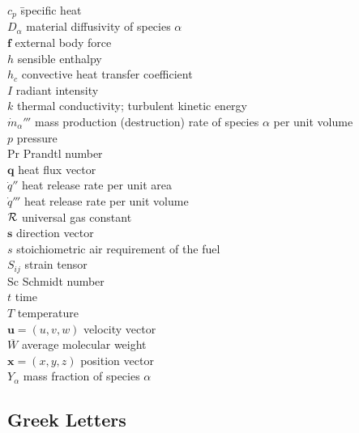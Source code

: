\documentclass[graybox]{svmult}
\begin{document}
\begin{tabbing}
$c_p$ 	\hspace{1in}     \= specific heat \\
$D_\alpha$	             \> material diffusivity of species $\alpha$ \\
$\mathbf{f}$	         \> external body force \\
$h$                      \>	sensible enthalpy \\
$h_c$ 	                 \> convective heat transfer coefficient \\
$I$	                     \> radiant intensity \\
$k$	                     \> thermal	conductivity; turbulent	kinetic energy \\
$\dot{m}_\alpha'''$      \> mass production (destruction) rate of species $\alpha$ per unit volume \\
$p$	                     \> pressure \\
Pr	                     \> Prandtl number \\
$\mathbf{q}$	         \> heat flux vector \\
$\dot{q}''$              \> heat release rate per unit area \\
$\dot{q}'''$             \> heat release rate per unit volume \\
$\cal R$                 \> universal gas constant \\
$\mathbf{s}$	         \> direction vector \\
$s$	                     \> stoichiometric air requirement of the fuel \\
$S_{ij}$ 	             \> strain tensor \\
Sc	                     \> Schmidt number \\
$t$	                     \> time \\
$T$	                     \> temperature \\
$\mathbf{u}=(u,v,w)$     \> velocity vector \\
$\overline{W}$	         \> average molecular weight \\
$\mathbf{x}=(x,y,z)$	 \> position vector \\
$Y_\alpha$               \> mass fraction of species $\alpha$
\end{tabbing}

\subsection{Greek Letters}
\end{document}
